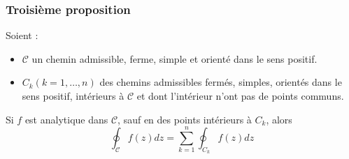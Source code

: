         
        \subsubsection{Troisième proposition}
        Soient :
        \begin{itemize}
        \item $\mathcal{C}$ un chemin admissible, ferme, simple et orienté dans le sens
        positif.
        \item $C_k (k=1,\dots,n)$ des chemins admissibles fermés, simples, orientés dans
        le sens positif, intérieurs à $\mathcal{C}$ et dont l'intérieur n'ont pas de 
        points communs.
        \end{itemize}
        Si $f$ est analytique dans $\mathcal{C}$, sauf en des points intérieurs à $C_k$,
        alors 
        \begin{equation}
        \oint_\mathcal{C} f(z) dz = \sum_{k=1}^n \oint_{C_k} f(z) dz
        \end{equation}
        